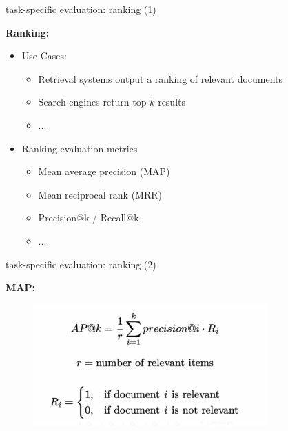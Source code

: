 
\begin{vbframe}{task-specific evaluation: ranking (1)}

\vfill

\textbf{Ranking:}

\begin{itemize}
		\item Use Cases:
				\begin{itemize}
					\item Retrieval systems output a ranking of relevant documents
					\item Search engines return top $k$ results
					\item ...
				\end{itemize}
		\item Ranking evaluation metrics
				\begin{itemize}
					\item Mean average precision (MAP)
					\item Mean reciprocal rank (MRR)
					\item Precision@k / Recall@k
					\item ...
				\end{itemize}
\end{itemize}
\vfill

\end{vbframe}


\begin{vbframe}{task-specific evaluation: ranking (2)}

\vfill

\textbf{MAP:}

\begin{figure}
    \centering
    \includegraphics[width=9cm]{figure/42-ap.png}
\end{figure}

\vfill

\end{vbframe}

